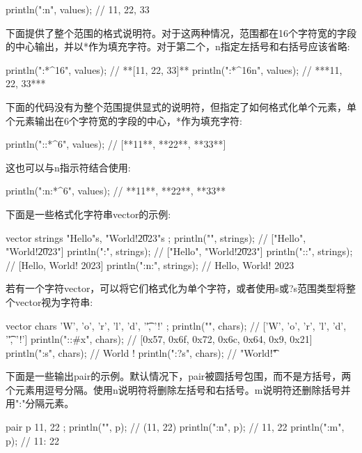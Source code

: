 \begin{cpp}
println("{{{:n}}}", values); // {11, 22, 33}
\end{cpp}

下面提供了整个范围的格式说明符。对于这两种情况，范围都在16个字符宽的字段的中心输出，并以*作为填充字符。对于第二个，n指定左括号和右括号应该省略:

\begin{cpp}
println("{:*^16}", values); // **[11, 22, 33]**
println("{:*^16n}", values); // ***11, 22, 33***
\end{cpp}

下面的代码没有为整个范围提供显式的说明符，但指定了如何格式化单个元素，单个元素输出在6个字符宽的字段的中心，*作为填充字符:

\begin{cpp}
println("{::*^6}", values); // [**11**, **22**, **33**]
\end{cpp}

这也可以与n指示符结合使用:

\begin{cpp}
println("{:n:*^6}", values); // **11**, **22**, **33**
\end{cpp}

下面是一些格式化字符串vector的示例:

\begin{cpp}
vector strings { "Hello"s, "World!\t2023"s };
println("{}", strings);     // ["Hello", "World!\t2023"]
println("{:}", strings);    // ["Hello", "World!\t2023"]
println("{::}", strings);   // [Hello, World!   2023]
println("{:n:}", strings);  // Hello, World!   2023
\end{cpp}

若有一个字符vector，可以将它们格式化为单个字符，或者使用s或?s范围类型将整个vector视为字符串:

\begin{cpp}
vector chars { 'W', 'o', 'r', 'l', 'd', '\t', '!' };
println("{}", chars);       // ['W', 'o', 'r', 'l', 'd', '\t', '!']
println("{::#x}", chars);   // [0x57, 0x6f, 0x72, 0x6c, 0x64, 0x9, 0x21]
println("{:s}", chars);     // World    !
println("{:?s}", chars);    // "World\t!"
\end{cpp}

下面是一些输出pair的示例。默认情况下，pair被圆括号包围，而不是方括号，两个元素用逗号分隔。使用n说明符将删除左括号和右括号。m说明符还删除括号并用":"分隔元素。

\begin{cpp}
pair p { 11, 22 };
println("{}", p);     // (11, 22)
println("{:n}", p);   // 11, 22
println("{:m}", p);   // 11: 22
\end{cpp}

